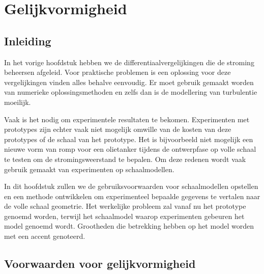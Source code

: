 \chapter{Gelijkvormigheid}
\label{sec:Gelijkvormigheid}

	\section{Inleiding}
	\label{sec:Gelijkvormigheid Inleiding}
In het vorige hoofdstuk hebben we de differentiaalvergelijkingen die de stroming beheersen afgeleid. Voor praktische problemen is een oplossing voor deze vergelijkingen vinden alles behalve eenvoudig. Er moet gebruik gemaakt worden van numerieke oplossingsmethoden en zelfs dan is de modellering van turbulentie moeilijk.

Vaak is het nodig om experimentele resultaten te bekomen. Experimenten met prototypes zijn echter vaak niet mogelijk omwille van de kosten van deze prototypes of de schaal van het prototype. Het is bijvoorbeeld niet mogelijk een nieuwe vorm van romp voor een olietanker tijdens de ontwerpfase op volle schaal te testen om de stromingsweerstand te bepalen. Om deze redenen wordt vaak gebruik gemaakt van experimenten op schaalmodellen.

In dit hoofdstuk zullen we de gebruiksvoorwaarden voor schaalmodellen opstellen en een methode ontwikkelen om experimenteel bepaalde gegevens te vertalen naar de volle schaal geometrie. Het werkelijke probleem zal vanaf nu het prototype genoemd worden, terwijl het schaalmodel waarop experimenten gebeuren het model genoemd wordt. Grootheden die betrekking hebben op het model worden met een accent genoteerd.

	\section{Voorwaarden voor gelijkvormigheid}
	\label{sec:Voorwaarden voor gelijkvormigheid}
